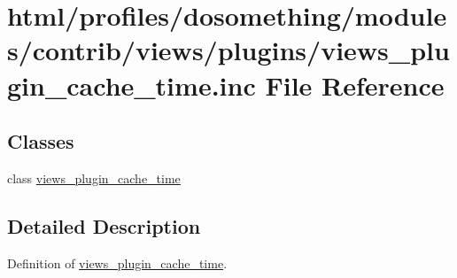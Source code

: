 \hypertarget{views__plugin__cache__time_8inc}{
\section{html/profiles/dosomething/modules/contrib/views/plugins/views\_\-plugin\_\-cache\_\-time.inc File Reference}
\label{views__plugin__cache__time_8inc}
}
\subsection*{Classes}
\begin{DoxyCompactItemize}
\item 
class \hyperlink{classviews__plugin__cache__time}{views\_\-plugin\_\-cache\_\-time}
\end{DoxyCompactItemize}


\subsection{Detailed Description}
Definition of \hyperlink{classviews__plugin__cache__time}{views\_\-plugin\_\-cache\_\-time}. 